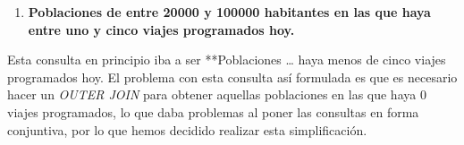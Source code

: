 \begin{Shaded}
\begin{Highlighting}[]
     
        \OperatorTok{=}
     
        \OperatorTok{=}\OperatorTok{=}
\OperatorTok{=}\OperatorTok{=}
    \OperatorTok{\textless{}} \NormalTok{;}
\end{Highlighting}
\end{Shaded}

\begin{enumerate}
\def\labelenumi{\arabic{enumi}.}
\setcounter{enumi}{2}
\tightlist
\item
  \textbf{Poblaciones de entre 20000 y 100000 habitantes en las que haya
  entre uno y cinco viajes programados hoy.}
\end{enumerate}

Esta consulta en principio iba a ser **Poblaciones \ldots{} haya menos
de cinco viajes programados hoy. El problema con esta consulta así
formulada es que es necesario hacer un \emph{OUTER JOIN} para obtener
aquellas poblaciones en las que haya 0 viajes programados, lo que daba
problemas al poner las consultas en forma conjuntiva, por lo que hemos
decidido realizar esta simplificación.

